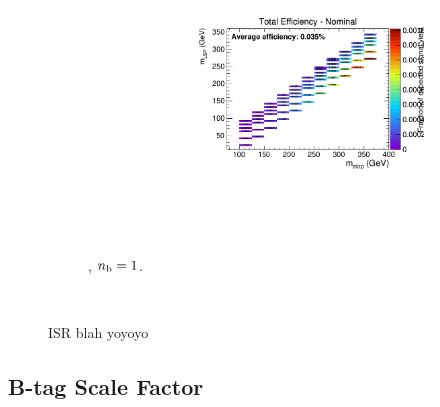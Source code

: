\begin{figure}[ht!]
\begin{subfigure}[b]{0.32\textwidth}
    \includegraphics[width=\textwidth, page=6]{Figs/sms/t2cc/v24/ISR_T2cc_v24_eq1b_ge4j_incl.pdf}
    \caption{\njhigh, $n_{\text{b}} = 1$.}
  \end{subfigure}\\
  \caption{ISR blah yoyoyo}
  \label{fig:sms-isr-t2cc}
\end{figure}


\newpage
\subsection*{B-tag Scale Factor}
\label{sec:t2cc_btag_plots}

